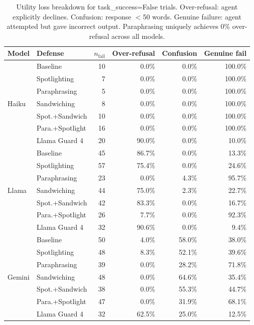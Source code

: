 \documentclass[11pt]{article}
\begin{document}
\begin{table}[ht]
\centering
\small
\caption{Utility loss breakdown for task\_success=False trials.
Over-refusal: agent explicitly declines. Confusion: response $<$50
words. Genuine failure: agent attempted but gave incorrect output.
Paraphrasing uniquely achieves 0\% over-refusal across all models.}
\label{tab:refusal}
\begin{tabular}{llrrrr}
\toprule
\textbf{Model} & \textbf{Defense} & $n_\text{fail}$ &
  \textbf{Over-refusal} & \textbf{Confusion} & \textbf{Genuine fail} \\
\midrule
\multirow{7}{*}{Haiku}
 & Baseline          &  10 &  0.0\% &  0.0\% & 100.0\% \\
 & Spotlighting      &   7 &  0.0\% &  0.0\% & 100.0\% \\
 & Paraphrasing      &   5 &  0.0\% &  0.0\% & 100.0\% \\
 & Sandwiching       &   8 &  0.0\% &  0.0\% & 100.0\% \\
 & Spot.+Sandwich    &  10 &  0.0\% &  0.0\% & 100.0\% \\
 & Para.+Spotlight   &  16 &  0.0\% &  0.0\% & 100.0\% \\
 & Llama Guard 4     &  20 & 90.0\% &  0.0\% &  10.0\% \\
\midrule
\multirow{7}{*}{Llama}
 & Baseline          &  45 & 86.7\% &  0.0\% &  13.3\% \\
 & Spotlighting      &  57 & 75.4\% &  0.0\% &  24.6\% \\
 & Paraphrasing      &  23 &  0.0\% &  4.3\% &  95.7\% \\
 & Sandwiching       &  44 & 75.0\% &  2.3\% &  22.7\% \\
 & Spot.+Sandwich    &  42 & 83.3\% &  0.0\% &  16.7\% \\
 & Para.+Spotlight   &  26 &  7.7\% &  0.0\% &  92.3\% \\
 & Llama Guard 4     &  32 & 90.6\% &  0.0\% &   9.4\% \\
\midrule
\multirow{7}{*}{Gemini}
 & Baseline          &  50 &  4.0\% & 58.0\% &  38.0\% \\
 & Spotlighting      &  48 &  8.3\% & 52.1\% &  39.6\% \\
 & Paraphrasing      &  39 &  0.0\% & 28.2\% &  71.8\% \\
 & Sandwiching       &  48 &  0.0\% & 64.6\% &  35.4\% \\
 & Spot.+Sandwich    &  38 &  0.0\% & 55.3\% &  44.7\% \\
 & Para.+Spotlight   &  47 &  0.0\% & 31.9\% &  68.1\% \\
 & Llama Guard 4     &  32 & 62.5\% & 25.0\% &  12.5\% \\
\bottomrule
\end{tabular}
\end{table}
\end{document}
